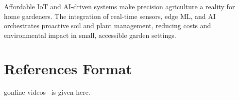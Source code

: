 \documentclass{sigchi}
\begin{document}
Affordable IoT and AI-driven systems make precision agriculture a reality for home gardeners. The integration of real-time sensors, edge ML, and AI orchestrates proactive soil and plant management, reducing costs and environmental impact in small, accessible garden settings.

\balance{}

\section{References Format}
gonline videos~\cite{psy:gangnam} is given here.




\end{document}
